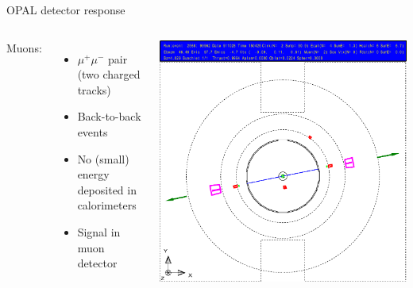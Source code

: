 \documentclass[11pt,xcolor=dvipsnames,professionalfonts]{beamer}
\begin{document}
\begin{frame}{OPAL detector response}
	\begin{columns}
		Muons:
		\begin{itemize}
			\setlength\itemsep{.5em}
			\item $\mu^+\mu^-$ pair (two charged tracks)
			\item Back-to-back events
			\item No (small) energy deposited in calorimeters
			\item Signal in muon detector
		\end{itemize}
		\includegraphics[width=1.0\textwidth]{./talkfigs/pdf/mm_02.pdf}
	\end{columns}
\end{frame}
\end{document}
